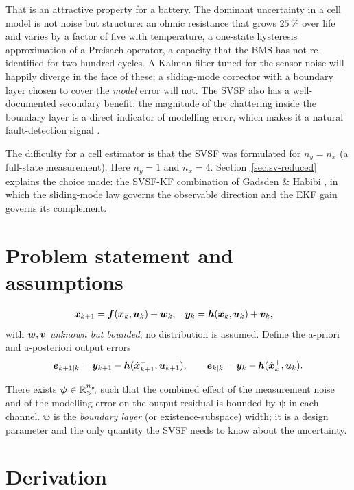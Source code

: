 That is an attractive property for a battery.  The dominant uncertainty in a cell model is not
noise but structure: an ohmic resistance that grows $25\,\%$ over life and varies by a factor of
five with temperature, a one-state hysteresis approximation of a Preisach operator, a capacity that
the BMS has not re-identified for two hundred cycles.  A Kalman filter tuned for the sensor noise
will happily diverge in the face of these; a sliding-mode corrector with a boundary layer chosen to
cover the \emph{model} error will not.  The SVSF also has a well-documented secondary benefit: the
magnitude of the chattering inside the boundary layer is a direct indicator of modelling error,
which makes it a natural fault-detection signal \cite{gadsden2011svsfkf}.

The difficulty for a cell estimator is that the SVSF was formulated for $n_y=n_x$ (a full-state
measurement).  Here $n_y=1$ and $n_x=4$.  Section~\ref{sec:sv-reduced} explains the choice made:
the SVSF-KF combination of Gadsden \& Habibi \cite{gadsden2010svsfcov}, in which the sliding-mode
law governs the observable direction and the EKF gain governs its complement.

\section{Problem statement and assumptions}
\begin{align}
\bm{x}_{k+1}&=\bm{f}(\bm{x}_k,\bm{u}_k)+\bm{w}_k, & \bm{y}_k&=\bm{h}(\bm{x}_k,\bm{u}_k)+\bm{v}_k, \label{eq:sv-model}
\end{align}
with $\bm{w},\bm{v}$ \emph{unknown but bounded}; no distribution is assumed.  Define the a-priori and
a-posteriori output errors
\begin{equation}
\bm{e}_{k+1|k}=\bm{y}_{k+1}-\bm{h}(\hat{\bm{x}}^{-}_{k+1},\bm{u}_{k+1}),
\qquad
\bm{e}_{k|k}=\bm{y}_{k}-\bm{h}(\hat{\bm{x}}^{+}_{k},\bm{u}_{k}).
\label{eq:sv-e}
\end{equation}

\begin{assumption}\label{as:sv-psi}
There exists $\bm\psi\in\mathbb{R}^{n_y}_{>0}$ such that the combined effect of the measurement noise
and of the modelling error on the output residual is bounded by $\bm\psi$ in each channel.
$\bm\psi$ is the \emph{boundary layer} (or existence-subspace) width; it is a design parameter and
the only quantity the SVSF needs to know about the uncertainty.
\end{assumption}

\section{Derivation}

